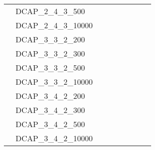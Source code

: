\begin{table}[H]
{\begin{tabular}{lllllllll}
			& DCAP\_2\_4\_3\_500               &                           &                         &                           &                         &                           &                         &                                 \\
			& DCAP\_2\_4\_3\_10000             &                           &                         &                           &                         &                           &                         &                                 \\
			& DCAP\_3\_3\_2\_200               &                           &                         &                           &                         &                           &                         &                                 \\
			& DCAP\_3\_3\_2\_300               &                           &                         &                           &                         &                           &                         &                                 \\
			& DCAP\_3\_3\_2\_500               &                           &                         &                           &                         &                           &                         &                                 \\
			& DCAP\_3\_3\_2\_10000             &                           &                         &                           &                         &                           &                         &                                 \\
			& DCAP\_3\_4\_2\_200               &                           &                         &                           &                         &                           &                         &                                 \\
			& DCAP\_3\_4\_2\_300               &                           &                         &                           &                         &                           &                         &                                 \\
			& DCAP\_3\_4\_2\_500               &                           &                         &                           &                         &                           &                         &                                 \\
			& DCAP\_3\_4\_2\_10000             &                           &                         &                           &                         &                           &                         &                                 \\ \hline
		\end{tabular}%
	}
\end{table}


